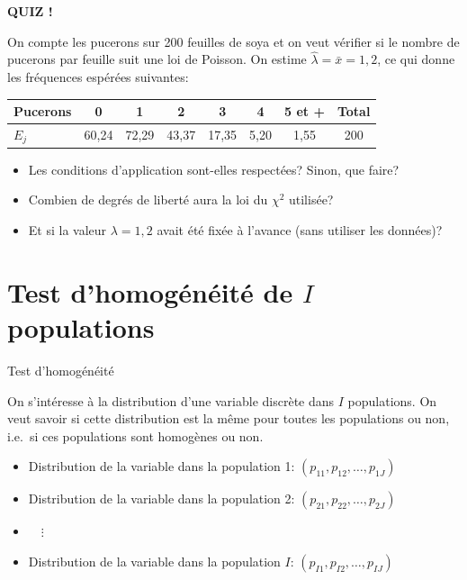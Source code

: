 \documentclass{BeamerTemplate}
\begin{document}
\begin{frame}[plain,t]
  \centerline{\LARGE\bfseries\alert{QUIZ !}}

  \medskip
  On compte les pucerons sur 200 feuilles de soya et on veut vérifier si le nombre
  de pucerons par feuille suit une loi de \alert{Poisson}. On estime
  $\hat\lambda=\bar x=1{,}2$, ce qui donne les fréquences espérées suivantes:

  \smallskip
  \begin{center}
  \small
  \renewcommand{\arraystretch}{1.3}
  \begin{tabular}{l|cccccc|c}
  Pucerons & 0 & 1 & 2 & 3 & 4 & 5 et + & Total\\
  \hline
  $E_j$ & 60{,}24 & 72{,}29 & 43{,}37 & 17{,}35 & 5{,}20 & 1{,}55 & 200\\
  \end{tabular}
  \end{center}

  \begin{itemize}\itemsep 1.2cm
    \item Les conditions d'application sont-elles respectées? Sinon, que faire?
    \item<2-> Combien de degrés de liberté aura la loi du $\chi^2$ utilisée?
    \item<3-> Et si la valeur $\lambda=1{,}2$ avait été fixée à l'avance
    (sans utiliser les données)?
  \end{itemize}
\end{frame}

\section{Test d'homogénéité de $I$ populations}

\begin{frame}[t]{Test d'homogénéité}

On s'intéresse à la distribution d'une variable discrète dans $I$ populations.
On veut savoir si cette distribution est la même pour toutes les populations ou
non, i.e.\ si ces populations sont \alert{homogènes} ou non.

\medskip
\begin{itemize}\itemsep1mm
  \item Distribution de la variable dans la population 1: $(p_{11},p_{12},\ldots,p_{1J})$
  \item Distribution de la variable dans la population 2: $(p_{21},p_{22},\ldots,p_{2J})$
  \item[] $\quad\vdots$
  \item Distribution de la variable dans la population $I$: $(p_{I1},p_{I2},\ldots,p_{IJ})$
\end{itemize}

\end{frame}
\end{document}
